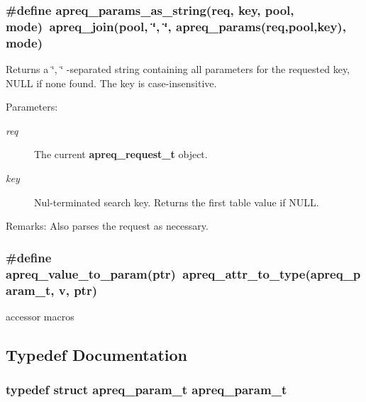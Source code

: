 \subsubsection{\setlength{\rightskip}{0pt plus 5cm}\#define apreq\_\-params\_\-as\_\-string(req, key, pool, mode)\ apreq\_\-join(pool, \char`\"{}, \char`\"{}, apreq\_\-params(req,pool,key), mode)}\label{group__params_a19}


Returns a \char`\"{}, \char`\"{} -separated string containing all parameters for the requested key, NULL if none found. The key is case-insensitive. \begin{Desc}
\item[Parameters:]
\begin{description}
\item[{\em req}]The current {\bf apreq\_\-request\_\-t} object. \item[{\em key}]Nul-terminated search key. Returns the first table value if NULL. \end{description}
\end{Desc}
\begin{Desc}
\item[Remarks:]Also parses the request as necessary. \end{Desc}
\subsubsection{\setlength{\rightskip}{0pt plus 5cm}\#define apreq\_\-value\_\-to\_\-param(ptr)\ apreq\_\-attr\_\-to\_\-type({\bf apreq\_\-param\_\-t}, v, ptr)}\label{group__params_a13}


accessor macros 

\subsection{Typedef Documentation}
\subsubsection{\setlength{\rightskip}{0pt plus 5cm}typedef struct apreq\_\-param\_\-t  apreq\_\-param\_\-t}\label{group__params_a0}


